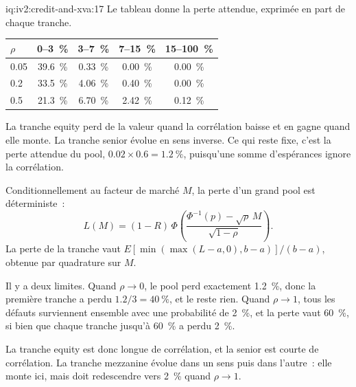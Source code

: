 \begin{solution}{iq:iv2:credit-and-xva:17}
Le tableau donne la perte attendue, exprimée en part de chaque tranche.

\begin{center}
\begin{tabular}{lcccc}
\toprule
$\rho$ & 0--3~\% & 3--7~\% & 7--15~\% & 15--100~\% \\
\midrule
0.05 & 39.6~\% & 0.33~\% & 0.00~\% & 0.00~\% \\
0.2 & 33.5~\% & 4.06~\% & 0.40~\% & 0.00~\% \\
0.5 & 21.3~\% & 6.70~\% & 2.42~\% & 0.12~\% \\
\bottomrule
\end{tabular}
\end{center}

La tranche equity perd de la valeur quand la corrélation baisse et en gagne quand elle monte. La tranche senior évolue en sens inverse. Ce qui reste fixe, c'est la perte attendue du pool, $0.02 \times 0.6 = 1.2~\%$, puisqu'une somme d'espérances ignore la corrélation.

Conditionnellement au facteur de marché $M$, la perte d'un grand pool est déterministe~:
\[
L(M) = (1 - R)\,\Phi\!\left(\frac{\Phi^{-1}(p) - \sqrt{\rho}\,M}{\sqrt{1 - \rho}}\right).
\]
La perte de la tranche vaut $E[\min(\max(L - a, 0), b - a)]/(b - a)$, obtenue par quadrature sur $M$.

Il y a deux limites. Quand $\rho \to 0$, le pool perd exactement 1.2~\%, donc la première tranche a perdu $1.2/3 = 40~\%$, et le reste rien. Quand $\rho \to 1$, tous les défauts surviennent ensemble avec une probabilité de 2~\%, et la perte vaut 60~\%, si bien que chaque tranche jusqu'à 60~\% a perdu 2~\%.

La tranche equity est donc longue de corrélation, et la senior est courte de corrélation. La tranche mezzanine évolue dans un sens puis dans l'autre~: elle monte ici, mais doit redescendre vers 2~\% quand $\rho \to 1$.

\end{solution}

